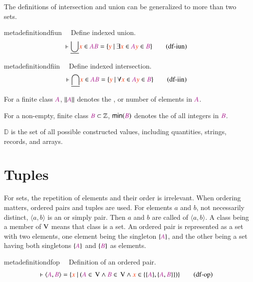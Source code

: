 \pn The definitions of intersection and union can be generalized to more than two sets.  
\begin{restatable}{metadefinition}{dfiun}~~ Define indexed union. 
\begin{align}
\vdash \underline{\bigcup} \msc{x} \in \mc{A} \mc{B} = \{ \msc{y}~\vert~\exists
    \msc{x} \in \mc{A} \msc{y} \in \mc{B} \}\label{eq:df-iun}\tag{df-iun}
\end{align}
\end{restatable}

\begin{restatable}{metadefinition}{dfiin}~~ Define indexed intersection.  
\begin{align}
\vdash \underline{\bigcap} \msc{x} \in \mc{A} \mc{B} = \{ \msc{y}~\vert~\forall
    \msc{x} \in \mc{A} \msc{y} \in \mc{B} \}\label{eq:df-iin}\tag{df-iin}
\end{align}
\end{restatable}


\pn For a finite class $\mc{A}$, $\Vert \mc{A}\Vert$ denotes the , or number of elements in $\mc{A}$.  

\pn For a non-empty, finite class $\mc{B}\subset\mathbb{Z}$, $\bmin(\mc{B})$ denotes the  of all integers in $\mc{B}$.

\pn $\mathbb{D}$ is the set of all possible constructed values, including quantities, strings, records, and arrays. 

\section{Tuples}\label{sec:tuples}

\pn For sets, the repetition of elements and their order is irrelevant.  When ordering matters, ordered pairs and tuples are used.  For elements $a$ and $b$, not necessarily distinct, $\langle a,b\rangle $ is an  or simply pair.  Then $a$ and $b$ are called  of $\langle a,b\rangle$.  A class being a member of ${\rm V}$ means that class is a set.  An ordered pair is represented as a set with two elements, one element being the singleton $\{ \mc{A} \}$, and the other being a set having both singletons $\{ \mc{A} \}$ and $\{ \mc{B} \}$ as elements.
\begin{restatable}{metadefinition}{dfop}~~ Definition of an ordered pair.
\begin{align}
\vdash \langle \mc{A} , \mc{B} \rangle = \{ \msc{x}~\vert~( \mc{A} \in \,\mathrm{V}
    \wedge \mc{B} \in \,\mathrm{V} \wedge \msc{x} \in \{ \{ \mc{A} \} , \{
    \mc{A} , \mc{B} \} \} ) \}\label{eq:df-op}\tag{df-op}
\end{align}
\end{restatable}

